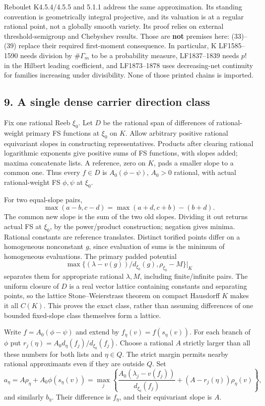 \documentclass[
  10pt,
]{article}
\begin{document}
Reboulet K4.5.4/4.5.5 and 5.1.1 address the same approximation. Its
standing convention is geometrically integral projective, and its
valuation is at a regular rational point, not a globally smooth variety.
Its proof relies on external threshold-semigroup and Chebyshev results.
Those are \textbf{not} premises here: (33)--(39) replace their required
first-moment consequence. In particular, K LF1585--1590 needs division
by \(\#\Gamma_m\) to be a probability measure, LF1837--1839 needs \(p!\)
in the Hilbert leading coefficient, and LF1873--1878 uses decreasing-net
continuity for families increasing under divisibility. None of those
printed chains is imported.

\subsection{9. A single dense carrier direction
class}\label{a-single-dense-carrier-direction-class}

Fix one rational Reeb \(\xi_0\). Let \(D\) be the rational span of
differences of rational-weight primary FS functions at \(\xi_0\) on
\(K\). Allow arbitrary positive rational equivariant slopes in
constructing representatives. Products after clearing rational
logarithmic exponents give positive sums of FS functions, with slopes
added; maxima concatenate lists. A reference, zero on \(K\), pads a
smaller slope to a common one. Thus every \(f\in D\) is
\(A_0(\phi-\psi)\), \(A_0>0\) rational, with actual rational-weight FS
\(\phi,\psi\) at \(\xi_0\).

For two equal-slope pairs, \[ \max(a-b,c-d)=\max(a+d,c+b)-(b+d). \] The
common new slope is the sum of the two old slopes. Dividing it out
returns actual FS at \(\xi_0\), by the power/product construction;
negation gives minima. Rational constants are reference translates.
Distinct torified points differ on a homogeneous nonconstant \(g\),
since evaluation of sums is the minimum of homogeneous evaluations. The
primary padded potential
\[ \max\{(\lambda-v(g))/d_{\xi_0}(g),\rho_{\xi_0}-M\}\big|_K \]
separates them for appropriate rational \(\lambda,M\), including
finite/infinite pairs. The uniform closure of \(D\) is a real vector
lattice containing constants and separating points, so the lattice
Stone--Weierstrass theorem on compact Hausdorff \(K\) makes it all
\(C(K)\). This proves the exact class, rather than assuming differences
of one bounded fixed-slope class themselves form a lattice.

Write \(f=A_0(\phi-\psi)\) and extend by \(f_\eta(v)=f(s_\eta(v))\). For
each branch of \(\phi\) put \(r_j(\eta)=A_0d_\eta(f_j)/d_{\xi_0}(f_j)\).
Choose a rational \(A\) strictly larger than all these numbers for both
lists and \(\eta\in Q\). The strict margin permits nearby rational
approximants even if they are outside \(Q\). Set
\[ a_\eta=A\rho_\eta+A_0\phi(s_\eta(v))
 =\max_j\left\{\frac{A_0(\lambda_j-v(f_j))}{d_{\xi_0}(f_j)}+(A-r_j(\eta))\rho_\eta(v)\right\},        \tag{41}\]
and similarly \(b_\eta\). Their difference is \(f_\eta\), and their
equivariant slope is \(A\).
\end{document}
